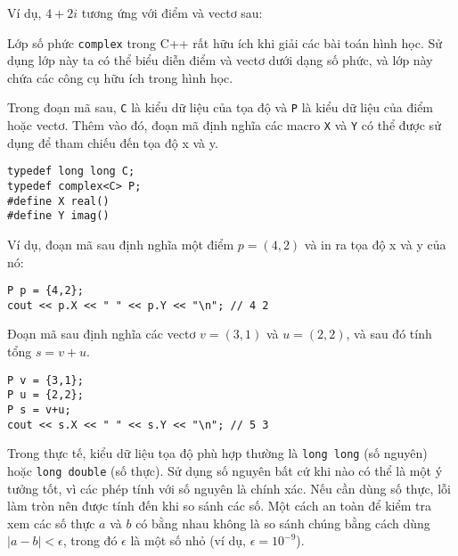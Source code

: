Ví dụ, $4+2i$ tương ứng với
điểm và vectơ sau:

\begin{center}
\end{center}


Lớp số phức \texttt{complex} trong C++ rất
hữu ích khi giải các bài toán hình học.
Sử dụng lớp này ta có thể biểu diễn điểm và vectơ
dưới dạng số phức, và lớp này chứa các công cụ
hữu ích trong hình học.

Trong đoạn mã sau, \texttt{C} là kiểu dữ liệu của
tọa độ và \texttt{P} là kiểu dữ liệu của điểm hoặc vectơ.
Thêm vào đó, đoạn mã định nghĩa các macro \texttt{X} và \texttt{Y}
có thể được sử dụng để tham chiếu đến tọa độ x và y.

\begin{lstlisting}
typedef long long C;
typedef complex<C> P;
#define X real()
#define Y imag()
\end{lstlisting}

Ví dụ, đoạn mã sau định nghĩa một điểm $p=(4,2)$
và in ra tọa độ x và y của nó:

\begin{lstlisting}
P p = {4,2};
cout << p.X << " " << p.Y << "\n"; // 4 2
\end{lstlisting}

Đoạn mã sau định nghĩa các vectơ $v=(3,1)$ và $u=(2,2)$,
và sau đó tính tổng $s=v+u$.

\begin{lstlisting}
P v = {3,1};
P u = {2,2};
P s = v+u;
cout << s.X << " " << s.Y << "\n"; // 5 3
\end{lstlisting}

Trong thực tế,
kiểu dữ liệu tọa độ phù hợp thường là
\texttt{long long} (số nguyên) hoặc \texttt{long double}
(số thực).
Sử dụng số nguyên bất cứ khi nào có thể là một ý tưởng tốt,
vì các phép tính với số nguyên là chính xác.
Nếu cần dùng số thực,
lỗi làm tròn nên được tính đến
khi so sánh các số.
Một cách an toàn để kiểm tra xem các số thực $a$ và $b$ có bằng nhau không
là so sánh chúng bằng cách dùng $|a-b|<\epsilon$,
trong đó $\epsilon$ là một số nhỏ (ví dụ, $\epsilon=10^{-9}$).


